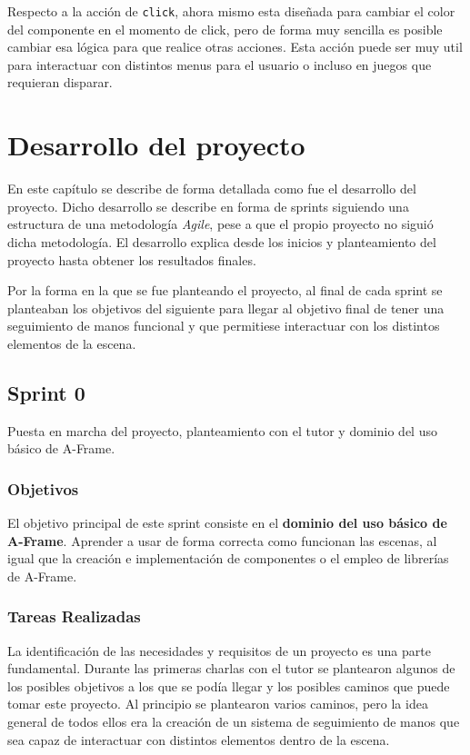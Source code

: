 \documentclass[a4paper, 12pt]{book}
\begin{document}
Respecto a la acción de \texttt{click}, ahora mismo esta diseñada para cambiar el color del componente en el momento de click, pero de forma muy sencilla es posible cambiar esa lógica para que realice otras acciones. Esta acción puede ser muy util para interactuar con distintos menus para el usuario o incluso en juegos que requieran disparar. 

\cleardoublepage
\chapter{Desarrollo del proyecto}
\label{chap:Desarrollo del proyecto}
En este capítulo se describe de forma detallada como fue el desarrollo del proyecto. Dicho desarrollo
se describe en forma de sprints siguiendo una estructura de una metodología \textit{Agile}\cite{asana_agile_methodology}, pese a que el propio proyecto no siguió dicha metodología. 
El desarrollo explica desde los inicios y planteamiento del proyecto hasta obtener los resultados finales.

Por la forma en la que se fue planteando el proyecto, al final de cada sprint se planteaban los objetivos del siguiente para llegar al objetivo final de tener una seguimiento de manos funcional y que permitiese interactuar con los distintos elementos de la escena. \section{Sprint 0}
\label{sec:sprint0}
Puesta en marcha del proyecto, planteamiento con el tutor y dominio del uso básico de A-Frame.
\subsection{Objetivos}
\label{subsec:objetivo-principal0}
El objetivo principal de este sprint consiste en el \textbf{dominio del uso básico de A-Frame}. Aprender a usar de forma correcta como funcionan las escenas, al igual que la creación e implementación de componentes o el empleo de librerías de A-Frame.

\subsection{Tareas Realizadas}
\label{subsec:implementacion0}
La identificación de las necesidades y requisitos de un proyecto es una parte fundamental. Durante las primeras charlas con el tutor se plantearon algunos de los posibles objetivos a los que se podía llegar y los posibles caminos que puede tomar este proyecto. 
Al principio se plantearon varios caminos, pero la idea general de todos ellos era la creación de un sistema de seguimiento de manos que sea capaz de interactuar con distintos elementos dentro de la escena. 
\end{document}
